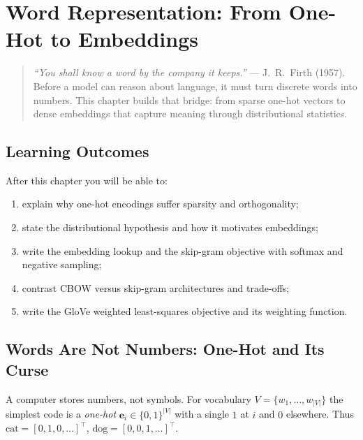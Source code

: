 \chapter{Word Representation: From One-Hot to Embeddings}
\label{ch:representation}
\begin{quote}
\emph{``You shall know a word by the company it keeps.''} --- J.~R.~Firth (1957).
Before a model can reason about language, it must turn discrete words into
numbers. This chapter builds that bridge: from sparse one-hot vectors to dense
embeddings that capture meaning through distributional statistics.
\end{quote}
\noindent{}
\vspace{0.3em}
\section*{Learning Outcomes}
After this chapter you will be able to:
\begin{enumerate}[label=(L\arabic*)]
    \item explain why one-hot encodings suffer sparsity and orthogonality;
    \item state the distributional hypothesis and how it motivates embeddings;
    \item write the embedding lookup and the skip-gram objective with softmax and negative sampling;
    \item contrast CBOW versus skip-gram architectures and trade-offs;
    \item write the GloVe weighted least-squares objective and its weighting function.
\end{enumerate}
\section{Words Are Not Numbers: One-Hot and Its Curse}
\label{sec:onehot}
A computer stores numbers, not symbols. For vocabulary $V=\{w_{1},\dots,w_{|V|}\}$ the simplest code is a \emph{one-hot} $\mathbf{e}_{i}\in\{0,1\}^{|V|}$ with a single $1$ at $i$ and $0$ elsewhere. Thus $\text{cat}=[0,1,0,\dots]^{\top}$, $\text{dog}=[0,0,1,\dots]^{\top}$.

